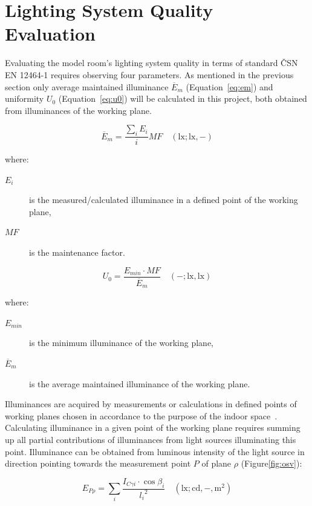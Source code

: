\section{Lighting System Quality Evaluation}
Evaluating the model room's lighting system quality in terms of standard \v{C}SN EN 12464-1\cite{12464} requires observing four parameters. As mentioned in the previous section only average maintained illuminance $\overline{E}_{m}$ (Equation~\ref{eq:em}) and uniformity $U_{0}$ (Equation~\ref{eq:u0}) will be calculated in this project, both obtained from illuminances of the working plane.

\begin{equation}
\overline{E}_{m}=\frac{\sum_{i} E_{i}}{i}MF \quad \mathrm{(lx;lx,-)}
\label{eq:em}
\end{equation}

where:
\begin{description}
	\item[$E_{i}$] is the measured/calculated illuminance in a defined point of the working plane,
	\item[$MF$] is the maintenance factor.
\end{description}

\begin{equation}
U_{0}=\frac{E_{min}\cdot MF}{\overline{E}_{m}} \quad \mathrm{(-;lx,lx)}
\label{eq:u0}
\end{equation}

where:
\begin{description}
	\item[$E_{min}$] is the minimum illuminance of the working plane,
	\item[$\overline{E}_{m}$] is the average maintained illuminance of the working plane.
\end{description}

Illuminances are acquired by measurements or calculations in defined points of working planes chosen in accordance to the purpose of the indoor space~\cite{12464}. Calculating illuminance in a given point of the working plane requires summing up all partial contributions of illuminances from light sources illuminating this point. Illuminance can be obtained from luminous intensity of the light source in direction pointing towards the measurement point $P$ of plane $\rho$ (Figure\ref{fig:osv}):

\begin{equation}
E_{P\rho}=\sum_{i} \frac{I_{C \gamma i} \cdot \cos{\beta_{i}}}{{l_{i}}^{2}} \quad \mathrm{(lx;cd,-,m^{2})}
\label{eq:illSum}
\end{equation}

